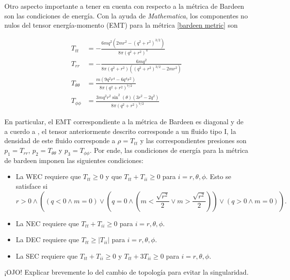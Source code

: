 \documentclass{article}
\numberwithin{equation}{section}
\begin{document}
Otro aspecto importante a tener en cuenta con respecto a la métrica de Bardeen son las condiciones de energía. Con la ayuda de \textit{Mathematica}, los componentes no nulos del tensor energía-momento (EMT) para la métrica \eqref{bardeen metric} son

\begin{equation}
\begin{split}
T_{tt} &= -\frac{6 m q^2 \left(2 m r^2-\left(q^2+r^2\right)^{3/2}\right)}{8 \pi \left(q^2+r^2\right)^4}\\
T_{rr} &= -\frac{6 m q^2}{8 \pi \left(q^2+r^2\right) \left(\left(q^2+r^2\right)^{3/2}-2 m r^2\right)}\\
T_{\theta \theta} &= \frac{m \left(9 q^2 r^4-6 q^4 r^2\right)}{8 \pi \left(q^2+r^2\right)^{7/2}}\\
T_{\phi \phi} &= \frac{3 m q^2 r^2 \sin ^2(\theta ) \left(3 r^2-2 q^2\right)}{8 \pi \left(q^2+r^2\right)^{7/2}}
\end{split}
\end{equation}

En particular, el EMT correspondiente a la métrica de Bardeen es diagonal y de a cuerdo a \cite{hawking}, el tensor anteriormente descrito corresponde a un fluido tipo I, la densidad de este fluido corresponde a $\rho = T_{tt}$ y las correspondientes presiones son $p_{1} = T_{rr}$, $p_{2} = T_{\theta \theta}$ y $p_{3} = T_{\phi \phi}$. Por ende, las condiciones de energía para la métrica de bardeen imponen las siguientes condiciones:

\begin{itemize}
\item La WEC requiere que $T_{tt} \geq 0$ y que $T_{tt} + T_{ii} \geq 0$ para $i = r,\theta,\phi$. Esto se satisface si
\begin{equation}
r>0\land \left((q<0\land m=0)\lor \left(q=0\land \left(m<\frac{\sqrt{r^2}}{2}\lor m>\frac{\sqrt{r^2}}{2}\right)\right)\lor (q>0\land m=0)\right).
\end{equation}
\item La NEC requiere que $T_{tt} + T_{ii} \geq 0$ para $i = r,\theta,\phi$.
\item La DEC requiere que $T_{tt} \geq |T_{ii}|$ para $i = r,\theta,\phi$.
\item La SEC requiere que $T_{tt} + T_{ii} \geq 0$ y $T_{tt} + 3T_{ii} \geq 0$ para $i = r,\theta,\phi$.
\end{itemize}


¡OJO! Explicar brevemente lo del cambio de topología para evitar la singularidad.\\
\end{document}
